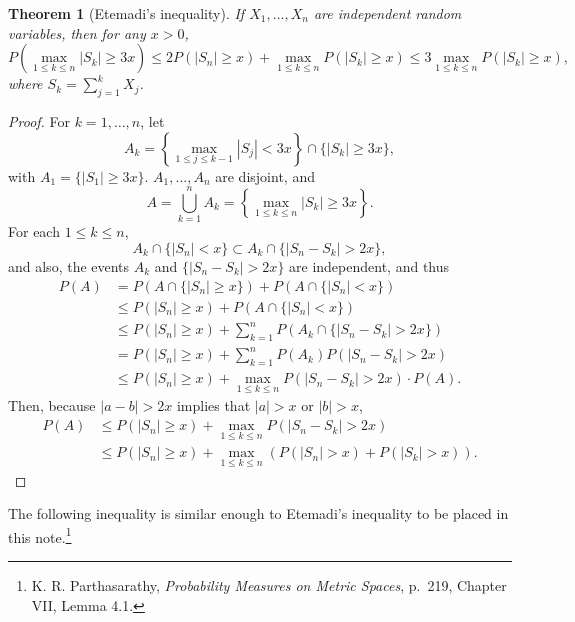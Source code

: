 \documentclass{article}
\newtheorem{theorem}{Theorem}
\theoremstyle{definition}
\begin{document}
\begin{theorem}[Etemadi's inequality]
If $X_1,\ldots,X_n$ are independent random variables, then for any $x>0$,
\[
P\left(\max_{1 \leq k \leq n} |S_k|  \geq 3x\right) \leq 
2P(|S_n| \geq x) + \max_{1 \leq k \leq n} P(|S_k| \geq x)
\leq
3 \max_{1 \leq k \leq n} P(|S_k| \geq x),
\]
where $S_k=\sum_{j=1}^k X_j$.
\label{subgaussian}
\end{theorem}
\begin{proof}
For $k=1,\ldots,n$, let
\[
A_k = \left\{\max_{1 \leq j \leq k-1} |S_j| < 3x\right\} \cap \{ |S_k| \geq 3x\},
\]
with $A_1=\{|S_1| \geq 3x\}$. $A_1,\ldots,A_n$ are disjoint, and
\[
A = \bigcup_{k=1}^n A_k = \left\{ \max_{1 \leq k \leq n} |S_k| \geq 3x\right\}.
\]
For each $1 \leq k \leq n$,
\[
A_k \cap  \{|S_n| < x\} \subset A_k \cap \{|S_n-S_k| > 2x\},
\]
and  also, the events $A_k$ and $\{|S_n-S_k|>2x\}$ are independent,
and thus
\begin{align*}
P(A)&=P(A \cap \{|S_n| \geq x\})+ P(A \cap \{|S_n| < x\})\\
&\leq P(|S_n| \geq x) +P(A \cap \{|S_n| < x\})\\
&\leq P(|S_n| \geq x) + \sum_{k=1}^n P(A_k \cap \{|S_n-S_k| > 2x\})\\
&= P(|S_n| \geq x) + \sum_{k=1}^n P(A_k) P(|S_n-S_k|>2x)\\
&\leq P(|S_n| \geq x) + \max_{1 \leq k \leq n} P(|S_n-S_k|>2x) \cdot
P(A).
\end{align*}
Then, because $|a-b| > 2x$ implies  that $|a| > x$ or $|b| > x$,
\begin{align*}
P(A)&\leq  P(|S_n| \geq x)  +  \max_{1 \leq k \leq n} P(|S_n-S_k|>2x)\\
&\leq P(|S_n| \geq x) + \max_{1 \leq k \leq n} \left(P(|S_n| > x)+P(|S_k| > x)\right).
\end{align*}
\end{proof}


The following inequality is similar enough to Etemadi's inequality to be placed in this note.\footnote{K. R.
Parthasarathy, {\em Probability Measures on Metric Spaces}, p.~219, Chapter VII, Lemma 4.1.}
\end{document}
